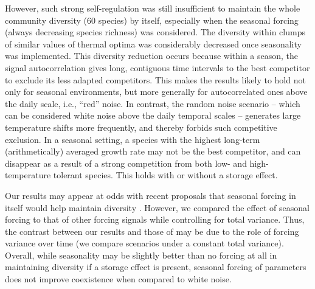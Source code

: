 \documentclass[a4paper,12pt]{article}
\begin{document}
However, such strong self-regulation was still insufficient to maintain
the whole community diversity (60 species) by itself, especially when
the seasonal forcing (always decreasing species richness) was considered.
The diversity within clumps of similar values of thermal optima was
considerably decreased once seasonality was implemented. This diversity
reduction occurs because within a season, the signal autocorrelation
gives long, contiguous time intervals to the best competitor to exclude
its less adapted competitors. This makes the results likely to hold
not only for seasonal environments, but more generally for autocorrelated
ones above the daily scale, i.e., ``red'' noise. In contrast, the
random noise scenario -- which can be considered white noise above
the daily temporal scales -- generates large temperature shifts more
frequently, and thereby forbids such competitive exclusion. In a seasonal
setting, a species with the highest long-term (arithmetically) averaged
growth rate may not be the best competitor, and can disappear as a
result of a strong competition from both low- and high-temperature
tolerant species. This holds with or without a storage effect. 

Our results may appear at odds with recent proposals that seasonal
forcing in itself would help maintain diversity \citep{sakavara_lumpy_2018}.
However, we compared the effect of seasonal forcing to that of other
forcing signals while controlling for total variance. Thus, the contrast
between our results and those of \citet{sakavara_lumpy_2018} may
be due to the role of forcing variance over time (we compare scenarios
under a constant total variance). Overall, while seasonality may be
slightly better than no forcing at all in maintaining diversity if
a storage effect is present, seasonal forcing of parameters does not
improve coexistence when compared to white noise.
\end{document}
